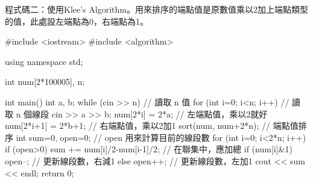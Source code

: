 程式碼二：使用Klee's Algorithm。用來排序的端點值是原數值乘以2加上端點類型的值，此處設左端點為0，右端點為1。
\begin{cppcode}

#include <iostream>
#include <algorithm>

using namespace std;

int num[2*100005], n;

int main()
{
	int a, b;
	while (cin >> n) { // 讀取 n 值
		for (int i=0; i<n; i++) { // 讀取 n 個線段
			cin >> a >> b;
			num[2*i] = 2*a; // 左端點值，乘以2就好
			num[2*i+1] = 2*b+1; // 右端點值，乘以2加1
		}
		sort(num, num+2*n); // 端點值排序
		int sum=0, open=0; // open 用來計算目前的線段數
		for (int i=0; i<2*n; i++) {
			if (open>0) sum += num[i]/2-num[i-1]/2; // 在聯集中，應加總
			if (num[i]&1) open--; // 更新線段數，右減1
			else open++; // 更新線段數，左加1
		}
		cout << sum << endl;
	}
	return 0;
}
\end{cppcode}	
